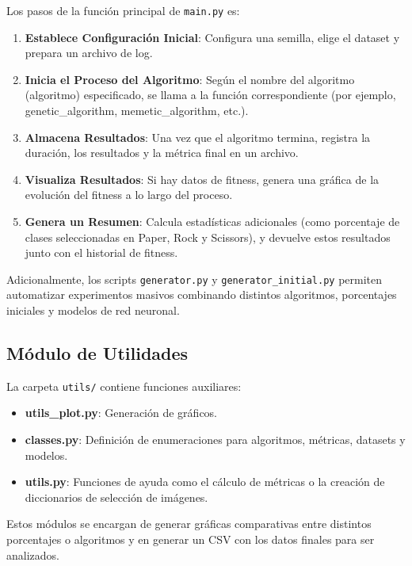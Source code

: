 Los pasos de la función principal de \texttt{main.py} es:
\begin{enumerate}
      \item \textbf{Establece Configuración Inicial}: Configura una semilla, elige el dataset y prepara un archivo de log.
      \item \textbf{Inicia el Proceso del Algoritmo}: Según el nombre del algoritmo (algoritmo) especificado, se llama a
            la función correspondiente (por ejemplo, genetic\_algorithm, memetic\_algorithm, etc.).
      \item \textbf{Almacena Resultados}: Una vez que el algoritmo termina, registra la duración, los resultados y la
            métrica final en un archivo.
      \item \textbf{Visualiza Resultados}: Si hay datos de fitness, genera una gráfica de la evolución del fitness a lo
            largo del proceso.
      \item \textbf{Genera un Resumen}: Calcula estadísticas adicionales (como porcentaje de clases seleccionadas en
            Paper, Rock y Scissors), y devuelve estos resultados junto con el historial de fitness.
\end{enumerate}


Adicionalmente, los scripts \texttt{generator.py} y \texttt{generator\_initial.py} permiten automatizar experimentos masivos combinando distintos algoritmos, porcentajes iniciales y modelos de red neuronal.

\subsection{Módulo de Utilidades}\label{subsec:modulo-de-utilidades}
La carpeta \texttt{utils/} contiene funciones auxiliares:
\begin{itemize}
      \item \textbf{utils\_plot.py}: Generación de gráficos.
      \item \textbf{classes.py}: Definición de enumeraciones para algoritmos, métricas, datasets y modelos.
      \item \textbf{utils.py}: Funciones de ayuda como el cálculo de métricas o la creación de diccionarios de selección de imágenes.
\end{itemize}

Estos módulos se encargan de generar gráficas comparativas entre distintos porcentajes o algoritmos y en
generar un CSV con los datos finales para ser analizados.

